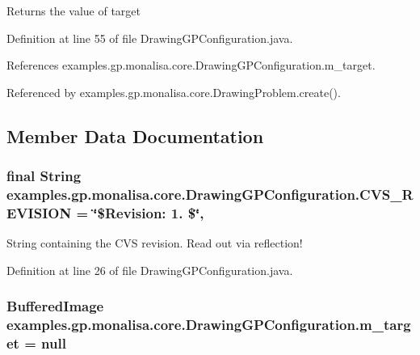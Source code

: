 \begin{DoxyReturn}{Returns}
the value of target 
\end{DoxyReturn}


Definition at line 55 of file Drawing\-G\-P\-Configuration.\-java.



References examples.\-gp.\-monalisa.\-core.\-Drawing\-G\-P\-Configuration.\-m\-\_\-target.



Referenced by examples.\-gp.\-monalisa.\-core.\-Drawing\-Problem.\-create().



\subsection{Member Data Documentation}
\hypertarget{classexamples_1_1gp_1_1monalisa_1_1core_1_1_drawing_g_p_configuration_a9fdd25c44986eff288a7e19c6e20b306}{
\subsubsection[{C\-V\-S\-\_\-\-R\-E\-V\-I\-S\-I\-O\-N}]{\setlength{\rightskip}{0pt plus 5cm}final String examples.\-gp.\-monalisa.\-core.\-Drawing\-G\-P\-Configuration.\-C\-V\-S\-\_\-\-R\-E\-V\-I\-S\-I\-O\-N = \char`\"{}\$Revision\-: 1. \$\char`\"{}\hspace{0.3cm}{\ttfamily [static]}, {\ttfamily [private]}}}\label{classexamples_1_1gp_1_1monalisa_1_1core_1_1_drawing_g_p_configuration_a9fdd25c44986eff288a7e19c6e20b306}
String containing the C\-V\-S revision. Read out via reflection! 

Definition at line 26 of file Drawing\-G\-P\-Configuration.\-java.

\hypertarget{classexamples_1_1gp_1_1monalisa_1_1core_1_1_drawing_g_p_configuration_a2343e3d99f1ddbc8f899155c6475db96}{
\subsubsection[{m\-\_\-target}]{\setlength{\rightskip}{0pt plus 5cm}Buffered\-Image examples.\-gp.\-monalisa.\-core.\-Drawing\-G\-P\-Configuration.\-m\-\_\-target = null\hspace{0.3cm}{\ttfamily [protected]}}}\label{classexamples_1_1gp_1_1monalisa_1_1core_1_1_drawing_g_p_configuration_a2343e3d99f1ddbc8f899155c6475db96}


